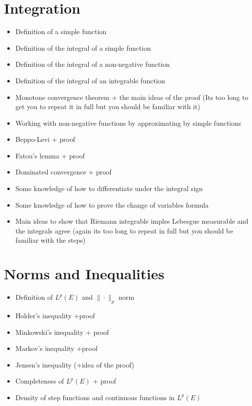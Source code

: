 \documentclass[
]{book}
\providecommand{\tightlist}{%
  \setlength{\itemsep}{0pt}\setlength{\parskip}{0pt}}
\theoremstyle{definition}
\theoremstyle{definition}
\theoremstyle{definition}
\theoremstyle{definition}
\theoremstyle{remark}
\begin{document}
\hypertarget{integration-2}{%
\section{Integration}\label{integration-2}}

\begin{itemize}
\tightlist
\item
  Definition of a simple function
\item
  Definition of the integral of a simple function
\item
  Definition of the integral of a non-negative function
\item
  Definition of the integral of an integrable function
\item
  Monotone convergence theorem + the main ideas of the proof (Its too long to get you to repeat it in full but you should be familiar with it)
\item
  Working with non-negative functions by approximating by simple functions
\item
  Beppo-Levi + proof
\item
  Fatou's lemma + proof
\item
  Dominated convergence + proof
\item
  Some knowledge of how to differentiate under the integral sign
\item
  Some knowledge of how to prove the change of variables formula
\item
  Main ideas to show that Riemann integrable imples Lebesgue measurable and the integrals agree (again its too long to repeat in full but you should be familiar with the steps)
\end{itemize}

\hypertarget{norms-and-inequalities-1}{%
\section{Norms and Inequalities}\label{norms-and-inequalities-1}}

\begin{itemize}
\tightlist
\item
  Definition of \(L^p(E)\) and \(\|\cdot\|_p\) norm
\item
  Holder's inequality +proof
\item
  Minkowski's inequality + proof
\item
  Markov's inequality +proof
\item
  Jensen's inequality (+idea of the proof)
\item
  Completeness of \(L^p(E)\) + proof
\item
  Density of step functions and continuous functions in \(L^p(E)\)
\end{itemize}
\end{document}
